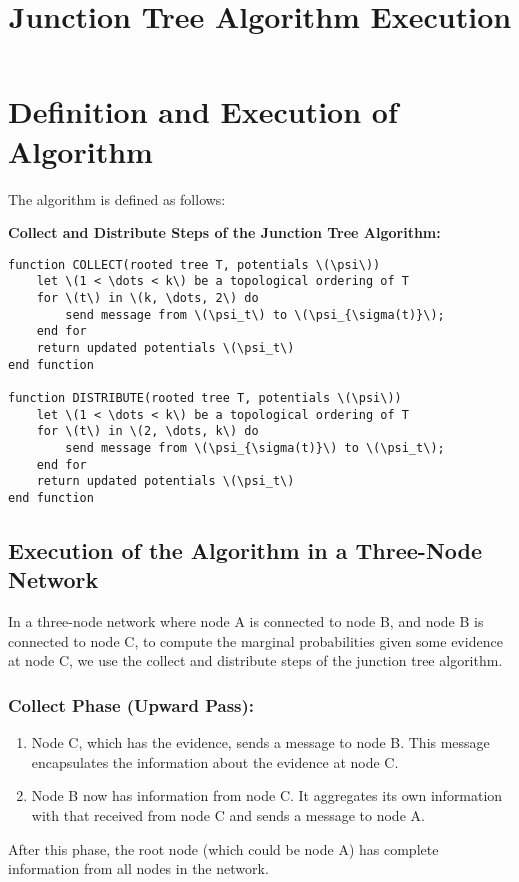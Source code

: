 \documentclass{article}
\title{Junction Tree Algorithm Execution}
\author{}
\date{}
\begin{document}
\maketitle

\section*{Definition and Execution of Algorithm}
The algorithm is defined as follows:

\textbf{Collect and Distribute Steps of the Junction Tree Algorithm:}

\begin{verbatim}
function COLLECT(rooted tree T, potentials \(\psi\))
    let \(1 < \dots < k\) be a topological ordering of T
    for \(t\) in \(k, \dots, 2\) do
        send message from \(\psi_t\) to \(\psi_{\sigma(t)}\);
    end for
    return updated potentials \(\psi_t\)
end function

function DISTRIBUTE(rooted tree T, potentials \(\psi\))
    let \(1 < \dots < k\) be a topological ordering of T
    for \(t\) in \(2, \dots, k\) do
        send message from \(\psi_{\sigma(t)}\) to \(\psi_t\);
    end for
    return updated potentials \(\psi_t\)
end function
\end{verbatim}

\subsection*{Execution of the Algorithm in a Three-Node Network}
In a three-node network where node A is connected to node B, and node B is connected to node C, to compute the marginal probabilities given some evidence at node C, we use the collect and distribute steps of the junction tree algorithm. 

\subsubsection*{Collect Phase (Upward Pass):}
\begin{enumerate}
    \item Node C, which has the evidence, sends a message to node B. This message encapsulates the information about the evidence at node C.
    \item Node B now has information from node C. It aggregates its own information with that received from node C and sends a message to node A.
\end{enumerate}

After this phase, the root node (which could be node A) has complete information from all nodes in the network.
\end{document}
